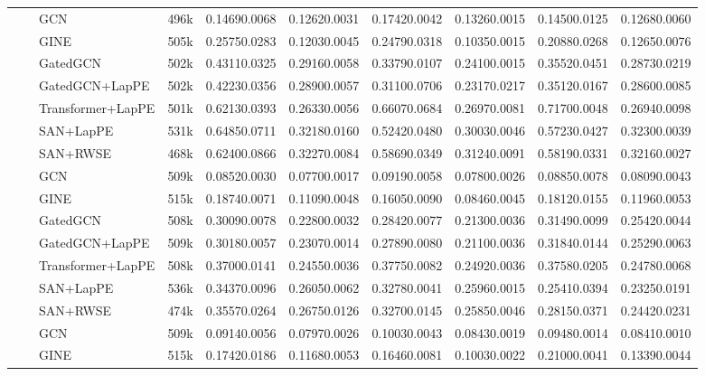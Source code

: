\documentclass{article}
\begin{document}
\begin{table}[h]
\begin{adjustwidth}{-2.5 cm}{-2.5 cm}
{\begin{tabular}{c c l c A B A B A B}
& \parbox[t]{2mm}{}& GCN &496k &0.14690.0068 &0.12620.0031 &0.17420.0042 &0.13260.0015 &0.14500.0125 &0.12680.0060 \\
& & GINE &505k &0.25750.0283 &0.12030.0045 &0.24790.0318 &0.10350.0015 &0.20880.0268 &0.12650.0076 \\
    & & GatedGCN & 502k & 0.43110.0325 & 0.29160.0058 & 0.33790.0107 & 0.24100.0015 & 0.35520.0451 &  0.28730.0219\\
    & & GatedGCN+LapPE &502k &0.42230.0356 &0.28900.0057 &0.31100.0706 &0.23170.0217 &0.35120.0167 &0.28600.0085 \\
    & & Transformer+LapPE &501k &0.62130.0393 &0.26330.0056 &0.66070.0684 &0.26970.0081 &0.71700.0048 &0.26940.0098 \\
    & & SAN+LapPE &531k &0.64850.0711 &0.32180.0160 &0.52420.0480 &0.30030.0046 &0.57230.0427 &0.32300.0039 \\
    & & SAN+RWSE &468k &0.62400.0866 &0.32270.0084 &0.58690.0349 &0.31240.0091 &0.58190.0331 &0.32160.0027 \\
\midrule[1pt]
\parbox[t]{5mm}{}& \parbox[t]{2mm}{}& GCN &509k &0.08520.0030 &0.07700.0017 &0.09190.0058 &0.07800.0026 &0.08850.0078 &0.08090.0043 \\
& & GINE &515k &0.18740.0071 &0.11090.0048 &0.16050.0090 &0.08460.0045 &0.18120.0155 &0.11960.0053 \\
& & GatedGCN &508k &0.30090.0078 &0.22800.0032 &0.28420.0077 &0.21300.0036 &0.31490.0099 &0.25420.0044 \\
    & & GatedGCN+LapPE &509k &0.30180.0057 &0.23070.0014 &0.27890.0080 &0.21100.0036 &0.31840.0144 &0.25290.0063 \\
    & & Transformer+LapPE &508k &0.37000.0141 &0.24550.0036 &0.37750.0082 &0.24920.0036 &0.37580.0205 &0.24780.0068 \\
    & & SAN+LapPE &536k &0.34370.0096 &0.26050.0062 &0.32780.0041 &0.25960.0015 &0.25410.0394 &0.23250.0191 \\
    & & SAN+RWSE &474k &0.35570.0264 &0.26750.0126 &0.32700.0145 &0.25850.0046 &0.28150.0371 &0.24420.0231 \\
& \parbox[t]{2mm}{}& GCN &509k &0.09140.0056 &0.07970.0026 &0.10030.0043 &0.08430.0019 &0.09480.0014 &0.08410.0010 \\
& & GINE &515k &0.17420.0186 &0.11680.0053 &0.16460.0081 &0.10030.0022 &0.21000.0041 &0.13390.0044 \\

\end{tabular}}
\end{adjustwidth}
\end{table}
\end{document}
